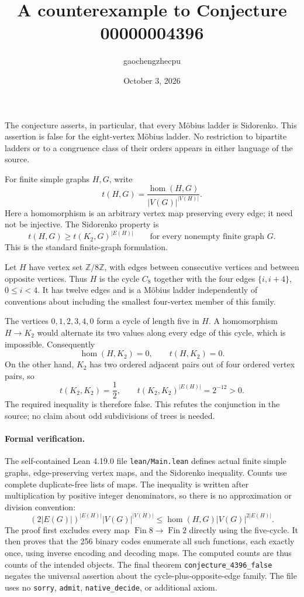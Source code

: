 \documentclass[10pt]{article}
\title{A counterexample to Conjecture 00000004396}
\author{gaochengzhecpu}
\date{October 3, 2026}
\begin{document}
\maketitle

The conjecture asserts, in particular, that every M\"obius ladder is
Sidorenko. This assertion is false for the eight-vertex M\"obius ladder.
No restriction to bipartite ladders or to a congruence class of their orders
appears in either language of the source.

For finite simple graphs $H,G$, write
\[
 t(H,G)=\frac{\operatorname{hom}(H,G)}{|V(G)|^{|V(H)|}}.
\]
Here a homomorphism is an arbitrary vertex map preserving every edge;
it need not be injective. The Sidorenko property is
\[
 t(H,G)\geq t(K_2,G)^{|E(H)|}\qquad\text{for every nonempty finite graph }G.
\]
This is the standard finite-graph formulation\cite{sidorenko}.

Let $H$ have vertex set $\mathbb Z/8\mathbb Z$, with edges between
consecutive vertices and between opposite vertices. Thus $H$ is the cycle
$C_8$ together with the four edges $\{i,i+4\}$, $0\leq i<4$.
It has twelve edges and is a M\"obius ladder independently of conventions
about including the smallest four-vertex member of this family.

The vertices $0,1,2,3,4,0$ form a cycle of length five in $H$.
A homomorphism $H\to K_2$ would alternate its two values along every edge
of this cycle, which is impossible. Consequently
\[
 \operatorname{hom}(H,K_2)=0,\qquad t(H,K_2)=0.
\]
On the other hand, $K_2$ has two ordered adjacent pairs out of four
ordered vertex pairs, so
\[
 t(K_2,K_2)=\frac12,\qquad
 t(K_2,K_2)^{|E(H)|}=2^{-12}>0.
\]
The required inequality is therefore false. This refutes the conjunction
in the source; no claim about odd subdivisions of trees is needed.

\paragraph{Formal verification.}
The self-contained Lean 4.19.0 file \texttt{lean/Main.lean} defines actual
finite simple graphs, edge-preserving vertex maps, and the Sidorenko
inequality. Counts use complete duplicate-free lists of maps. The
inequality is written after multiplication by positive integer
denominators, so there is no approximation or division convention:
\[
 (2|E(G)|)^{|E(H)|}|V(G)|^{|V(H)|}
 \leq \operatorname{hom}(H,G)|V(G)|^{2|E(H)|}.
\]
The proof first excludes every map $\operatorname{Fin}8\to
\operatorname{Fin}2$ directly using the five-cycle. It then proves that
the 256 binary codes enumerate all such functions, each exactly once,
using inverse encoding and decoding maps. The computed counts are thus
counts of the intended objects. The final theorem
\texttt{conjecture\_\allowbreak{}4396\_\allowbreak{}false} negates the universal assertion about
the cycle-plus-opposite-edge family. The file uses no \texttt{sorry},
\texttt{admit}, \texttt{native\_\allowbreak{}decide}, or additional axiom.
\end{document}
